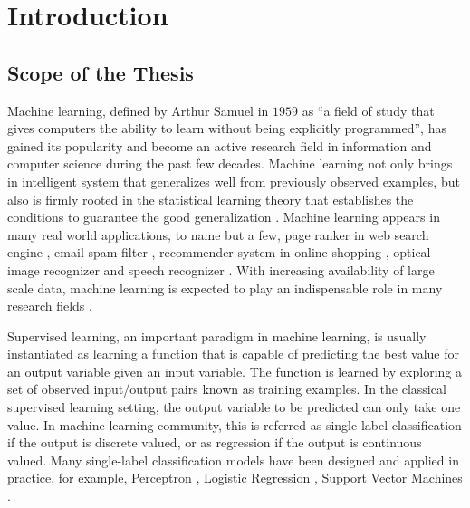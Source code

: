 




%
%
\chapter{Introduction}\label{ch_introduction}



%
%
\section{Scope of the Thesis}

Machine learning, defined by Arthur Samuel in $1959$ as ``a field of study that gives computers the ability to learn without being explicitly programmed'', has gained its popularity and become an active research field in information and computer science during the past few decades.
Machine learning not only brings in intelligent system that generalizes well from previously observed examples, but also is firmly rooted in the statistical learning theory that establishes the conditions to guarantee the good generalization \citep{Vapnik98statistical,Vapnik99an}.
Machine learning appears in many real world applications, to name but a few, page ranker in web search engine \citep{Richardson06beyond}, email spam filter \citep{Goodman06online}, recommender system in online shopping \citep{Bell07lessons}, optical image recognizer and speech recognizer \citep{Bengio09learning}.
With increasing availability of large scale data, machine learning is expected to play an indispensable role in many research fields \citep{Fan13mining}.

Supervised learning, an important paradigm in machine learning, is usually instantiated as learning a function that is capable of predicting the best value for an output variable given an input variable.
The function is learned by exploring a set of observed input/output pairs known as training examples.
In the classical supervised learning setting, the output variable to be predicted can only take one value.
In machine learning community, this is referred as single-label classification if the output is discrete valued, or as regression if the output is continuous valued.
Many single-label classification models have been designed and applied in practice, for example, Perceptron \citep{Rosenblatt58}, Logistic Regression \citep{Chen99}, Support Vector Machines \citep{Cortes95support}.

